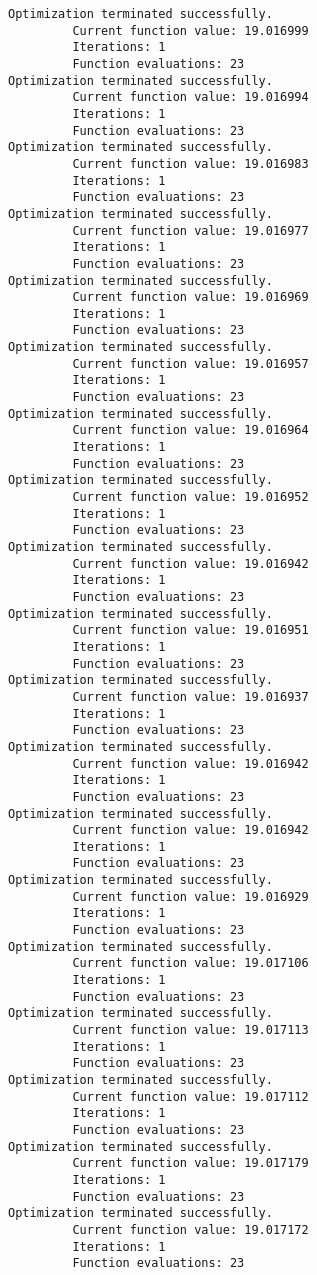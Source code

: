 \documentclass[11pt]{article}
\begin{document}
\begin{Verbatim}[commandchars=\\\{\}]
Optimization terminated successfully.
         Current function value: 19.016999
         Iterations: 1
         Function evaluations: 23
Optimization terminated successfully.
         Current function value: 19.016994
         Iterations: 1
         Function evaluations: 23
Optimization terminated successfully.
         Current function value: 19.016983
         Iterations: 1
         Function evaluations: 23
Optimization terminated successfully.
         Current function value: 19.016977
         Iterations: 1
         Function evaluations: 23
Optimization terminated successfully.
         Current function value: 19.016969
         Iterations: 1
         Function evaluations: 23
Optimization terminated successfully.
         Current function value: 19.016957
         Iterations: 1
         Function evaluations: 23
Optimization terminated successfully.
         Current function value: 19.016964
         Iterations: 1
         Function evaluations: 23
Optimization terminated successfully.
         Current function value: 19.016952
         Iterations: 1
         Function evaluations: 23
Optimization terminated successfully.
         Current function value: 19.016942
         Iterations: 1
         Function evaluations: 23
Optimization terminated successfully.
         Current function value: 19.016951
         Iterations: 1
         Function evaluations: 23
Optimization terminated successfully.
         Current function value: 19.016937
         Iterations: 1
         Function evaluations: 23
Optimization terminated successfully.
         Current function value: 19.016942
         Iterations: 1
         Function evaluations: 23
Optimization terminated successfully.
         Current function value: 19.016942
         Iterations: 1
         Function evaluations: 23
Optimization terminated successfully.
         Current function value: 19.016929
         Iterations: 1
         Function evaluations: 23
Optimization terminated successfully.
         Current function value: 19.017106
         Iterations: 1
         Function evaluations: 23
Optimization terminated successfully.
         Current function value: 19.017113
         Iterations: 1
         Function evaluations: 23
Optimization terminated successfully.
         Current function value: 19.017112
         Iterations: 1
         Function evaluations: 23
Optimization terminated successfully.
         Current function value: 19.017179
         Iterations: 1
         Function evaluations: 23
Optimization terminated successfully.
         Current function value: 19.017172
         Iterations: 1
         Function evaluations: 23

\end{Verbatim}
\end{document}

